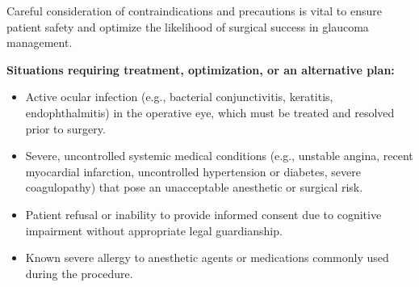 Careful consideration of contraindications and precautions is vital to ensure patient safety and optimize the likelihood of surgical success in glaucoma management.

\textbf{Situations requiring treatment, optimization, or an alternative plan:}
\begin{itemize}
  \item Active ocular infection (e.g., bacterial conjunctivitis, keratitis, endophthalmitis) in the operative eye, which must be treated and resolved prior to surgery.
  \item Severe, uncontrolled systemic medical conditions (e.g., unstable angina, recent myocardial infarction, uncontrolled hypertension or diabetes, severe coagulopathy) that pose an unacceptable anesthetic or surgical risk.
  \item Patient refusal or inability to provide informed consent due to cognitive impairment without appropriate legal guardianship.
  \item Known severe allergy to anesthetic agents or medications commonly used during the procedure.
\end{itemize}

